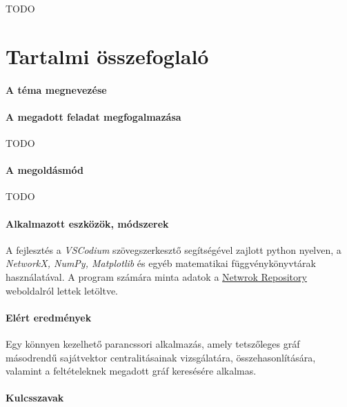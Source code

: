 \documentclass[12pt,numbers=noenddot]{report}
\begin{document}
TODO


\chapter*{Tartalmi összefoglaló}

\subsubsection*{A téma megnevezése}

\cim

\subsubsection*{A megadott feladat megfogalmazása}

TODO

\subsubsection*{A megoldásmód}

TODO

\subsubsection*{Alkalmazott eszközök, módszerek}

A fejlesztés a \textit{VSCodium} szövegszerkesztő segítségével
zajlott python nyelven, a \textit{NetworkX, NumPy, Matplotlib} és egyéb 
matematikai függvénykönyvtárak használatával. A program számára minta adatok
a \href{https://networkrepository.com/index.php}{Netwrok Repository} weboldalról
lettek letöltve.


\subsubsection*{Elért eredmények}

Egy könnyen kezelhető parancssori alkalmazás, amely tetszőleges gráf 
másodrendű sajátvektor centralitásainak vizsgálatára, összehasonlítására, 
valamint a feltételeknek megadott gráf keresésére alkalmas.

\subsubsection*{Kulcsszavak}
\end{document}
